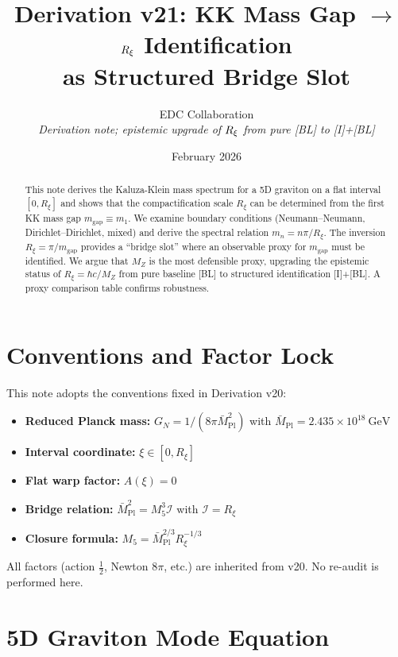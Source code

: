 \documentclass[11pt,a4paper]{article}
\title{Derivation v21: KK Mass Gap $\to$ $\Rxi$ Identification\\
as Structured Bridge Slot}
\author{EDC Collaboration\\[3pt]
\small\textit{Derivation note; epistemic upgrade of $\Rxi$ from pure [BL] to [I]+[BL]}}
\date{February 2026}
\newcommand{\Rxi}{R_\xi}
\newcommand{\Mplbar}{\bar{M}_{\mathrm{Pl}}}
\newcommand{\Mfive}{M_5}
\newcommand{\calI}{\mathcal{I}}
\newcommand{\GN}{G_N}
\newcommand{\MZ}{M_Z}
\newcommand{\mgap}{m_{\mathrm{gap}}}
\begin{document}
\maketitle

\begin{abstract}
This note derives the Kaluza-Klein mass spectrum for a 5D graviton on a flat
interval $[0,\Rxi]$ and shows that the compactification scale $\Rxi$ can be
determined from the first KK mass gap $\mgap \equiv m_1$. We examine boundary
conditions (Neumann--Neumann, Dirichlet--Dirichlet, mixed) and derive the
spectral relation $m_n = n\pi/\Rxi$. The inversion $\Rxi = \pi/\mgap$ provides
a ``bridge slot'' where an observable proxy for $\mgap$ must be identified.
We argue that $\MZ$ is the most defensible proxy, upgrading the epistemic
status of $\Rxi = \hbar c/\MZ$ from pure baseline [BL] to structured
identification [I]+[BL]. A proxy comparison table confirms robustness.
\end{abstract}

\section{Conventions and Factor Lock}

\begin{tcolorbox}[title=Factor Lock (from v20), colback=gray!10, colframe=gray!50]
This note adopts the conventions fixed in Derivation v20:
\begin{itemize}
\item \textbf{Reduced Planck mass:} $\GN = 1/(8\pi\Mplbar^2)$ with
$\Mplbar = 2.435 \times 10^{18}~\mathrm{GeV}$
\item \textbf{Interval coordinate:} $\xi \in [0, \Rxi]$
\item \textbf{Flat warp factor:} $A(\xi) = 0$
\item \textbf{Bridge relation:} $\Mplbar^2 = \Mfive^3 \calI$ with $\calI = \Rxi$
\item \textbf{Closure formula:} $\Mfive = \Mplbar^{2/3} \Rxi^{-1/3}$
\end{itemize}
All factors (action $\frac{1}{2}$, Newton $8\pi$, etc.) are inherited from v20.
No re-audit is performed here.
\end{tcolorbox}

\section{5D Graviton Mode Equation}
\end{document}
